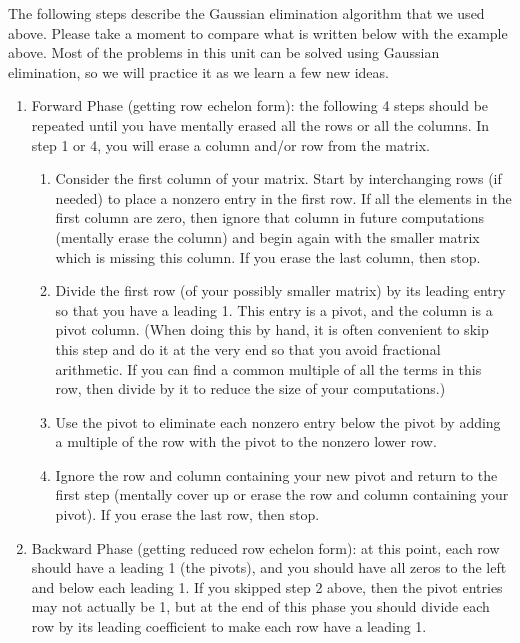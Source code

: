 {The following steps describe the Gaussian elimination algorithm that we used above. 
Please take a moment to compare what is written below with the example above. 
Most of the problems in this unit can be solved using Gaussian elimination, so we will practice it as we learn a few new ideas.
\begin{enumerate}
\item Forward Phase (getting row echelon form): the following 4 steps should be repeated until you have mentally erased all the rows or all the columns. In step 1 or 4, you will erase a column and/or row from the matrix.
\begin{enumerate}
	\item
Consider the first column of your matrix. Start by interchanging rows (if needed) to place a nonzero entry in the first row. If all the elements in the first column are zero, then ignore that column in future computations (mentally erase the column) and begin again with the smaller matrix which is missing this column. If you erase the last column, then stop.
  \item 
  Divide the first row (of your possibly smaller matrix) by its leading entry so that you have a leading 1. This entry is a pivot, and the column is a pivot column. (When doing this by hand, it is often convenient to skip this step and do it at the very end so that you avoid fractional arithmetic. If you can find a common multiple of all the terms in this row, then divide by it to reduce the size of your computations.)
	\item Use the pivot to eliminate each nonzero entry below the pivot by adding a multiple of the row with the pivot to the nonzero lower row.
	\item 
	Ignore the row and column containing your new pivot and return to the first step (mentally cover up or erase the row and column containing your pivot). If you erase the last row, then stop.
\end{enumerate}
	\item Backward Phase (getting reduced row echelon form): at this point, each row should have a leading 1 (the pivots), and you should have all zeros to the left and below each leading 1. If you skipped step 2 above, then the pivot entries may not actually be 1, but at the end of this phase you should divide each row by its leading coefficient to make each row have a leading 1.

\end{enumerate}}
